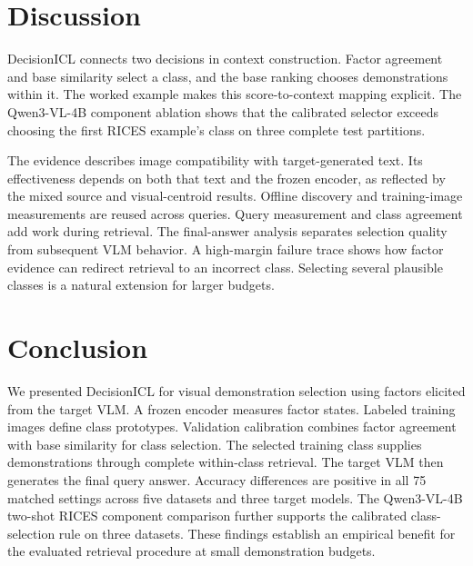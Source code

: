 \documentclass[10pt,twocolumn,letterpaper]{article}
\newcommand{\method}{DecisionICL\xspace}
\begin{document}
\section{Discussion}
\label{sec:discussion}
\method connects two decisions in context construction. Factor agreement and base similarity select a class, and the base ranking chooses demonstrations within it. The worked example makes this score-to-context mapping explicit. The Qwen3-VL-4B component ablation shows that the calibrated selector exceeds choosing the first RICES example's class on three complete test partitions.

The evidence describes image compatibility with target-generated text. Its effectiveness depends on both that text and the frozen encoder, as reflected by the mixed source and visual-centroid results. Offline discovery and training-image measurements are reused across queries. Query measurement and class agreement add work during retrieval. The final-answer analysis separates selection quality from subsequent VLM behavior. A high-margin failure trace shows how factor evidence can redirect retrieval to an incorrect class. Selecting several plausible classes is a natural extension for larger budgets.

\section{Conclusion}
We presented \method for visual demonstration selection using factors elicited from the target VLM. A frozen encoder measures factor states. Labeled training images define class prototypes. Validation calibration combines factor agreement with base similarity for class selection. The selected training class supplies demonstrations through complete within-class retrieval. The target VLM then generates the final query answer. Accuracy differences are positive in all 75 matched settings across five datasets and three target models. The Qwen3-VL-4B two-shot RICES component comparison further supports the calibrated class-selection rule on three datasets. These findings establish an empirical benefit for the evaluated retrieval procedure at small demonstration budgets.

{\small


}
\end{document}
